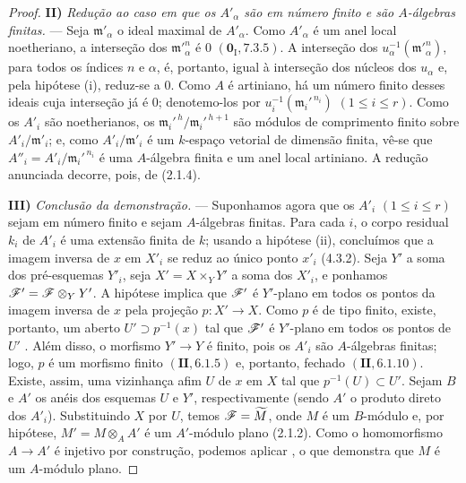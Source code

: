 \begin{proof}
\medskip
\noindent\textbf{II)}
\emph{Redução ao caso em que
os $A'_\alpha$ são em número
finito e são $A$-álgebras
finitas.} --- Seja
$\mathfrak m'_\alpha$ o ideal
maximal de $A'_\alpha$.
Como $A'_\alpha$ é um anel
local noetheriano, a
interseção dos
$\mathfrak m'^n_\alpha$ é
$0$ $(\mathbf 0_{\mathrm{I}},7.3.5)$.
A interseção dos
$u_\alpha^{-1}(\mathfrak m'^n_\alpha)$,
para todos
os índices $n$ e $\alpha$,
é, portanto, igual à
interseção dos núcleos dos
$u_\alpha$ e, pela hipótese
(i), reduz-se a $0$.
Como $A$ é artiniano, há
um número finito desses
ideais cuja interseção já
é $0$; denotemo-los por
$u_i^{-1}(\mathfrak m_i'^{\,n_i})$
$(1\leq i\leq r)$.
Como os $A'_i$ são
noetherianos, os
$\mathfrak m_i'^{\,h}/
\mathfrak m_i'^{\,h+1}$
são módulos de comprimento
finito sobre
$A'_i/\mathfrak m'_i$; e,
como $A'_i/\mathfrak m'_i$
é um $k$-espaço vetorial
de dimensão finita, vê-se
que $A''_i=A'_i/
\mathfrak m_i'^{\,n_i}$ é
uma $A$-álgebra finita e
um anel local artiniano.
A redução anunciada decorre,
pois, de (2.1.4).

\medskip
\noindent\textbf{III)}
\emph{Conclusão da
demonstração.} --- Suponhamos
agora que os $A'_i$
$(1\leq i\leq r)$ sejam
em número finito e sejam
$A$-álgebras finitas.
Para cada $i$, o corpo
residual $k_i$ de $A'_i$
é uma extensão finita de
$k$; usando a hipótese
(ii), concluímos que a
imagem inversa de $x$ em
$X'_i$ se reduz ao único
ponto $x'_i$ (4.3.2).
Seja $Y'$ a soma dos
pré-esquemas $Y'_i$, seja
$X'=X\times_Y Y'$ a soma
dos $X'_i$, e ponhamos
$\mathscr{F}'=\mathscr{F}\otimes_Y Y'$.
A hipótese implica que
$\mathscr{F}'$ é $Y'$-plano em
todos os pontos da imagem
inversa de $x$ pela
projeção $p:X'\to X$.
Como $p$ é de tipo finito,
existe, portanto, um
aberto $U'\supset
p^{-1}(x)$ tal que
$\mathscr{F}'$ é $Y'$-plano em
todos os pontos de $U'$
.
Além disso, o morfismo
$Y'\to Y$ é finito, pois
os $A'_i$ são $A$-álgebras
finitas; logo, $p$ é um
morfismo finito
$(\mathbf{II},6.1.5)$ e,
portanto, fechado
$(\mathbf{II},6.1.10)$.
Existe, assim, uma
vizinhança afim $U$ de
$x$ em $X$ tal que
$p^{-1}(U)\subset U'$.
Sejam $B$ e $A'$ os anéis
dos esquemas $U$ e $Y'$,
respectivamente (sendo
$A'$ o produto direto dos
$A'_i$). Substituindo
$X$ por $U$, temos
$\mathscr{F}=\widetilde M$,
onde $M$ é um $B$-módulo
e, por hipótese,
$M'=M\otimes_A A'$ é um
$A'$-módulo plano
(2.1.2). Como o
homomorfismo $A\to A'$ é
injetivo por construção,
podemos aplicar
, o que
demonstra que $M$ é um
$A$-módulo plano.
\end{proof}

